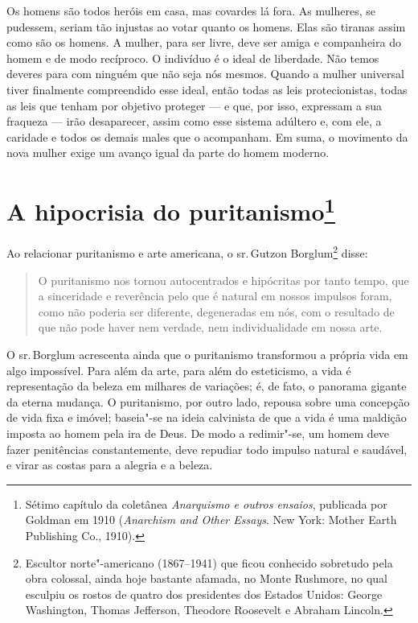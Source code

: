 Os homens são todos heróis em casa, mas covardes lá fora. As mulheres,
se pudessem, seriam tão injustas ao votar quanto os homens. Elas são tiranas assim como são os homens. A mulher, para ser livre, deve ser amiga e companheira do homem e de modo
recíproco. O indivíduo é o ideal de liberdade. Não temos deveres para com ninguém que não seja nós mesmos.
Quando a mulher universal tiver finalmente compreendido esse ideal,
então todas as leis protecionistas, todas as leis que tenham por
objetivo proteger --- e que, por isso, expressam a sua fraqueza --- irão %
desaparecer, assim como esse sistema adúltero e, com ele, a caridade e
todos os demais males que o acompanham. Em suma, o movimento da nova
mulher exige um avanço igual da parte do homem moderno.

\chapter{A hipocrisia do puritanismo\footnote[*]{Sétimo capítulo da coletânea
  \emph{Anarquismo e outros ensaios}, publicada por Goldman em 1910
  (\emph{Anarchism and Other Essays}. New York: Mother Earth Publishing
  Co., 1910).}}

Ao relacionar puritanismo e arte americana, o sr.\,Gutzon Borglum\footnote{Escultor norte"-americano (1867--1941) que ficou conhecido sobretudo pela obra colossal, ainda hoje bastante afamada, no Monte Rushmore, no qual esculpiu os rostos de quatro dos presidentes dos Estados Unidos: George Washington, Thomas Jefferson, Theodore Roosevelt e Abraham Lincoln.} disse:

\begin{quote}
O puritanismo nos tornou autocentrados e hipócritas por tanto tempo,
que a sinceridade e reverência pelo que é natural em nossos impulsos
foram, como não poderia ser diferente, degeneradas em nós, com o
resultado de que não pode haver nem verdade, nem individualidade em
nossa arte.
\end{quote}

O sr.\,Borglum acrescenta ainda que o puritanismo transformou a própria vida
em algo impossível. Para além da arte, para além do esteticismo, a vida
é representação da beleza em milhares de variações; é, de fato, o
panorama gigante da eterna mudança. O puritanismo, por outro lado,
repousa sobre uma concepção de vida fixa e imóvel; baseia"-se na ideia
calvinista de que a vida é uma maldição imposta ao homem pela ira de
Deus. De modo a redimir"-se, um homem deve fazer penitências
constantemente, deve repudiar todo impulso natural e saudável, e virar
as costas para a alegria e a beleza.

